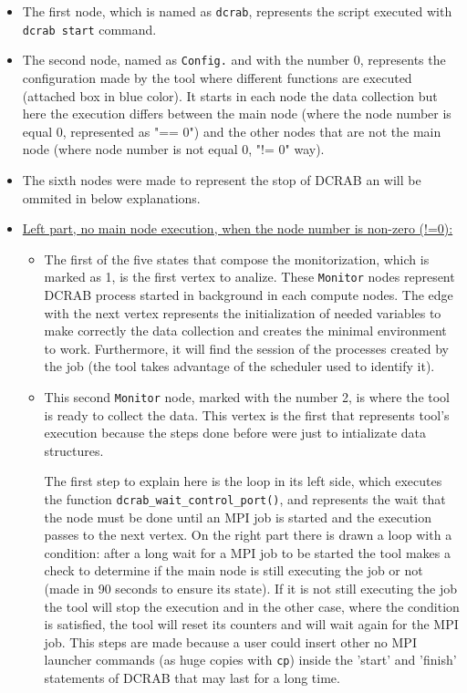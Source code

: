 \documentclass[10pt,a4paper]{report}
\begin{document}
\begin{itemize}
  \item The first node, which is named as \verb+dcrab+, represents the script executed with \verb+dcrab start+ command.
  \item The second node, named as \verb+Config.+ and with the number 0, represents the configuration made by the tool where different functions are executed (attached box in blue color). It starts in each node the data collection but here the execution differs between the main node (where the node number is equal 0, represented as "== 0") and the other nodes that are not the main node (where node number is not equal 0, "!= 0" way).
  \item The sixth nodes were made to represent the stop of DCRAB an will be ommited in below explanations.
  \item \underline{Left part, no main node execution, when the node number is non-zero (!=0): }
  \begin{itemize}
    \item The first of the five states that compose the monitorization, which is marked as 1, is the first vertex to analize. These \verb+Monitor+ nodes represent DCRAB process started in background in each compute nodes. The edge with the next vertex represents the initialization of needed variables to make correctly the data collection and creates the minimal environment to work. Furthermore, it will find the session of the processes created by the job (the tool takes advantage of the scheduler used to identify it).
    \item This second \verb+Monitor+ node, marked with the number 2, is where the tool is ready to collect the data. This vertex is the first that represents tool's execution because the steps done before were just to intializate data structures.

    The first step to explain here is the loop in its left side, which executes the function \texttt{dcrab\_wait\_control\_port()}, and represents the wait that the node must be done until an MPI job is started and the execution passes to the next vertex. On the right part there is drawn a loop with a condition: after a long wait for a MPI job to be started the tool makes a check to determine if the main node is still executing the job or not (made in 90 seconds to ensure its state). If it is not still executing the job the tool will stop the execution and in the other case, where the condition is satisfied, the tool will reset its counters and will wait again for the MPI job. This steps are made because a user could insert other no MPI launcher commands (as huge copies with \verb+cp+) inside the 'start' and 'finish' statements of DCRAB that may last for a long time.


\end{itemize}
\end{itemize}
\end{document}
